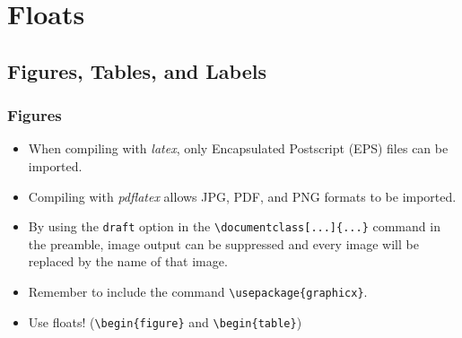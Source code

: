 \documentclass{beamer}
\begin{document}
\section{Floats}
\subsection{Figures, Tables, and Labels}

\begin{frame}[containsverbatim]
    \frametitle{Figures}
        \begin{itemize}
        \item When compiling with \emph{latex}, only Encapsulated Postscript (EPS) files can be imported.
        \item Compiling with \emph{pdflatex} allows JPG, PDF, and PNG formats to be imported.
        \item By using the \verb|draft| option in the \verb|\documentclass[...]{...}| command in the preamble, image output can be suppressed and every image will be replaced by the name of that image.
        \item Remember to include the command \verb|\usepackage{graphicx}|.
        \item Use floats! (\verb|\begin{figure}| and \verb|\begin{table}|)
    \end{itemize}
\end{frame}
\end{document}
